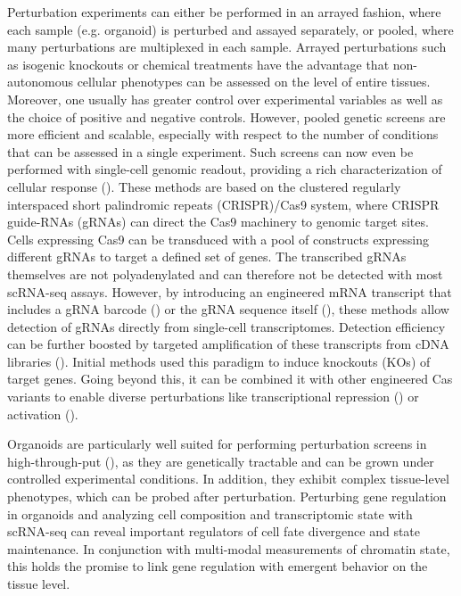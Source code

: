 Perturbation experiments can either be performed in an arrayed fashion, where each sample (e.g. organoid) is perturbed and assayed separately, or pooled, where many perturbations are multiplexed in each sample. Arrayed perturbations such as isogenic knockouts or chemical treatments have the advantage that non-autonomous cellular phenotypes can be assessed on the level of entire tissues. Moreover, one usually has greater control over experimental variables as well as the choice of positive and negative controls. However, pooled genetic screens are more efficient and scalable, especially with respect to the number of conditions that can be assessed in a single experiment. Such screens can now even be performed with single-cell genomic readout, providing a rich characterization of cellular response (\cite{dixit_perturb-seq_2016,datlinger_pooled_2017,jaitin_dissecting_2016}). These methods are based on the clustered regularly interspaced short palindromic repeats (CRISPR)/Cas9 system, where CRISPR guide-RNAs (gRNAs) can direct the Cas9 machinery to genomic target sites. Cells expressing Cas9 can be transduced with a pool of constructs expressing different gRNAs to target a defined set of genes. The transcribed gRNAs themselves are not polyadenylated and can therefore not be detected with most scRNA-seq assays. However, by introducing an engineered mRNA transcript that includes a gRNA barcode (\cite{dixit_perturb-seq_2016,jaitin_dissecting_2016}) or the gRNA sequence itself (\cite{datlinger_pooled_2017}), these methods allow detection of gRNAs directly from single-cell transcriptomes. Detection efficiency can be further boosted by targeted amplification of these transcripts from cDNA libraries (\cite{hill_design_2018}). Initial methods used this paradigm to induce knockouts (KOs) of target genes. Going beyond this, it can be combined it with other engineered Cas variants to enable diverse perturbations like transcriptional repression (\cite{adamson_multiplexed_2016,gasperini_genome-wide_2019}) or activation (\cite{alda-catalinas_single-cell_2020}).

Organoids are particularly well suited for performing perturbation screens in high-through-put (\cite{camp_mapping_2019}), as they are genetically tractable and can be grown under controlled experimental conditions. In addition, they exhibit complex tissue-level phenotypes, which can be probed after perturbation. Perturbing gene regulation in organoids and analyzing cell composition and transcriptomic state with scRNA-seq can reveal important regulators of cell fate divergence and state maintenance. In conjunction with multi-modal measurements of chromatin state, this holds the promise to link gene regulation with emergent behavior on the tissue level.

